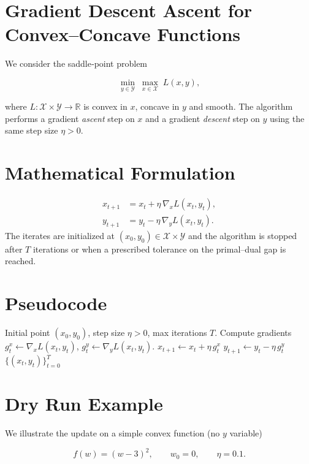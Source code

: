 \documentclass{article}
\begin{document}
\section*{Gradient Descent Ascent for Convex--Concave Functions}
We consider the saddle‑point problem  

\[
\min_{y\in\mathcal Y}\;\max_{x\in\mathcal X} \;L(x,y),
\]

where $L:\mathcal X\times\mathcal Y\rightarrow\mathbb R$ is convex in $x$, concave in $y$ and smooth.  
The algorithm performs a gradient \emph{ascent} step on $x$ and a gradient \emph{descent} step on $y$ using the same step size $\eta>0$.

\section*{Mathematical Formulation}
\begin{align}
x_{t+1} &= x_{t} + \eta\,\nabla_{x}L(x_t,y_t), \label{eq:ascent}\\
y_{t+1} &= y_{t} - \eta\,\nabla_{y}L(x_t,y_t). \label{eq:descent}
\end{align}
The iterates are initialized at $(x_0,y_0)\in\mathcal X\times\mathcal Y$ and the algorithm is stopped after $T$ iterations or when a prescribed tolerance on the primal–dual gap is reached.

\section*{Pseudocode}
\begin{algorithm}[H]
\caption{Gradient Descent Ascent (GDA)}\label{alg:gda}
\begin{algorithmic}[1]
\Require Initial point $(x_0,y_0)$, step size $\eta>0$, max iterations $T$.
    \State Compute gradients $g^x_t\gets \nabla_x L(x_t,y_t)$,
          $g^y_t\gets \nabla_y L(x_t,y_t)$.
    \State $x_{t+1}\gets x_t + \eta\, g^x_t$ 
    \State $y_{t+1}\gets y_t - \eta\, g^y_t$ 
\EndFor
\State \Return $\{(x_t,y_t)\}_{t=0}^{T}$
\end{algorithmic}
\end{algorithm}

\section*{Dry Run Example}
We illustrate the update on a simple convex function (no $y$ variable)  

\[
f(w)=(w-3)^2,\qquad w_0=0,\qquad \eta=0.1 .
\]
\end{document}
